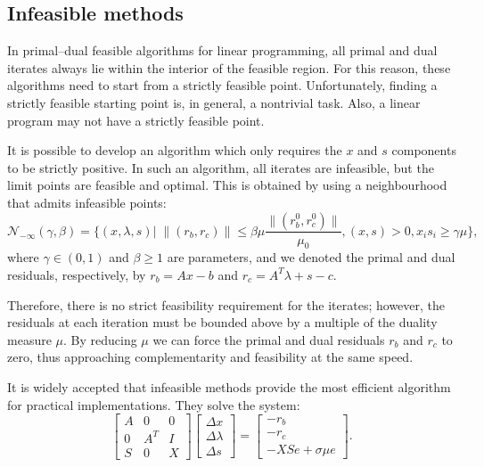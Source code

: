 %
%
\subsection{Infeasible methods}

In primal--dual feasible algorithms for linear programming, 
all primal and dual iterates always lie within the interior 
of the feasible region. For this reason, these algorithms 
need to start from a strictly feasible point. Unfortunately, 
finding a strictly feasible starting point is, in general, 
a nontrivial task. Also, a linear program may not have a 
strictly feasible point.

It is possible to develop an algorithm which only requires 
the $x$ and $s$ components to be strictly positive. In such 
an algorithm, all iterates are infeasible, but the limit points 
are feasible and optimal. This is obtained by using a 
neighbourhood that admits infeasible points:
\[
\mathcal{N}_{-\infty}(\gamma,\beta) =\{ (x,\lambda,s) | \; \|(r_b,r_c)\| \le \beta\mu \frac{\|(r_b^0,r_c^0)\|}{\mu_0}, (x,s)>0, x_is_i \ge \gamma\mu \},
\]
where $\gamma\in (0,1)$ and $\beta \ge 1$ are parameters, and 
we denoted the primal and dual residuals, respectively, by 
$r_b = Ax-b$ and $r_c = A^T\lambda+s-c$.

Therefore, there is no strict feasibility requirement for 
the iterates; however, the residuals at each iteration must be 
bounded above by a multiple of the duality measure $\mu$. 
By reducing $\mu$ we can force the primal and dual residuals 
$r_b$ and $r_c$ to zero, thus approaching complementarity and 
feasibility at the same speed.

It is widely accepted that infeasible methods provide the most 
efficient algorithm for practical implementations. They solve the system:
\[
\left[ \begin{array}{ccc}
    A & 0 & 0 \\ 0 &A^T & I \\ S & 0 & X
  \end{array} \right]
\left[ \begin{array}{c}
    \Delta x \\ \Delta \lambda \\ \Delta s
  \end{array} \right] = 
\left[ \begin{array}{c}
    -r_b \\ -r_c \\ -XSe + \sigma\mu e
  \end{array} \right].
\]

